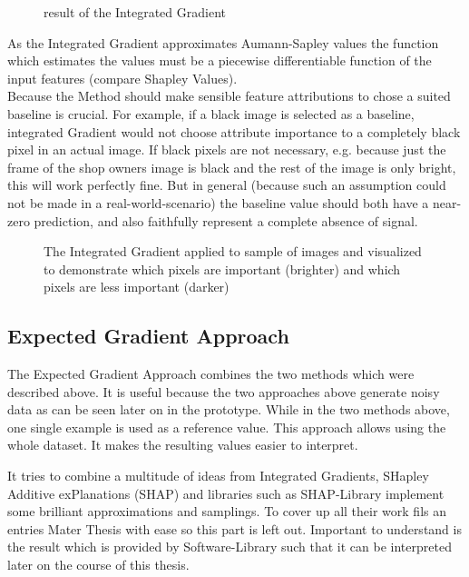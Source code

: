 \begin{figure}[!htp]
	\centering
	\caption{result of the Integrated Gradient}
	\label{fig:step5}
\end{figure}

As the Integrated Gradient approximates Aumann-Sapley values the function which estimates the values must be a piecewise differentiable function of the input features (compare Shapley Values).\\

Because the Method should make sensible feature attributions to chose a suited baseline is crucial. For example, if a black image is selected as a baseline, integrated Gradient would not choose attribute importance to a completely black pixel in an actual image. If black pixels are not necessary, e.g. because just the frame of the shop owners image is black and the rest of the image is only bright, this will work perfectly fine. But in general (because such an assumption could not be made in a real-world-scenario) the baseline value should both have a near-zero prediction, and also faithfully represent a complete absence of signal.\\

\begin{figure}[htp]
	\centering
	\caption{The Integrated Gradient applied to sample of images and visualized to demonstrate which pixels are important (brighter) and which pixels are less important (darker)}
	\label{fig:igiu}
\end{figure}

\subsection{Expected Gradient Approach}
\label{subsec:expected_gradient_approach}
The Expected Gradient Approach combines the two methods which were described above. It is useful because the two approaches above generate noisy data as can be seen later on in the prototype. While in the two methods above, one single example is used as a reference value. This approach allows using the whole dataset. It makes the resulting values easier to interpret. 

It tries to combine a multitude of ideas from Integrated Gradients, SHapley Additive exPlanations (SHAP) and libraries such as SHAP-Library implement some brilliant approximations and samplings. To cover up all their work fils an entries Mater Thesis with ease so this part is left out. Important to understand is the result which is provided by Software-Library such that it can be interpreted later on the course of this thesis.

